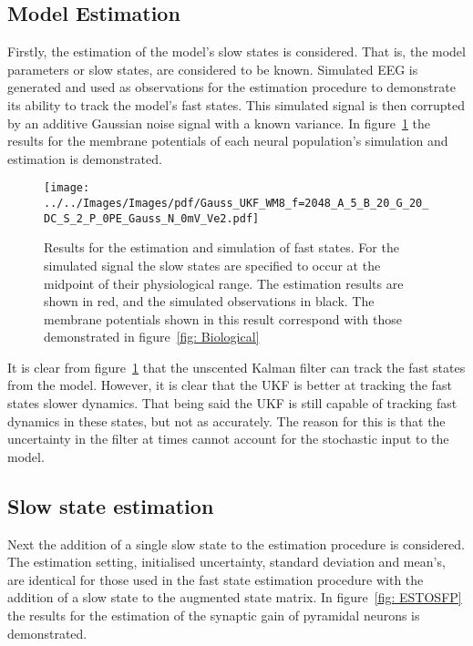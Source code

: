 \subsection{Model Estimation}
\label{ssec: MEstimation}

Firstly, the estimation of the model's slow states is considered. That is, the model parameters or slow states, are considered to be known. Simulated EEG is generated and used as observations for the estimation procedure to demonstrate its ability to track the model's fast states. This simulated signal is then corrupted by an additive Gaussian noise signal with a known variance. In figure~\ref{fig: EstFSO} the results for the membrane potentials of each neural population's simulation and estimation is demonstrated.
\begin{figure}%
	\centering
		\texttt{[image: ../../Images/Images/pdf/Gauss\_UKF\_WM8\_f=2048\_A\_5\_B\_20\_G\_20\_DC\_S\_2\_P\_0PE\_Gauss\_N\_0mV\_Ve2.pdf]}
	\caption{Results for the estimation and simulation of fast states. For the simulated signal the slow states are specified to occur at the midpoint of their physiological range. The estimation results are shown in red, and the simulated observations in black. The membrane potentials shown in this result correspond with those demonstrated in figure~\ref{fig: Biological}}
	\label{fig: EstFSO}
\end{figure}%


It is clear from figure~\ref{fig: EstFSO} that the unscented Kalman filter can track the fast states from the model. However, it is clear that the UKF is better at tracking the fast states slower dynamics. That being said the UKF is still capable of tracking fast dynamics in these states, but not as accurately. The reason for this is that the uncertainty in the filter at times cannot account for the stochastic input to the model. 

\subsection{Slow state estimation}
\label{ssec: SSEstimation}


Next the addition of a single slow state to the estimation procedure is considered. The estimation setting, initialised uncertainty, standard deviation and mean's, are identical for those used in the fast state estimation procedure with the addition of a slow state to the augmented state matrix. In figure~\ref{fig: ESTOSFP} the results for the estimation of the synaptic gain of pyramidal neurons is demonstrated. 

